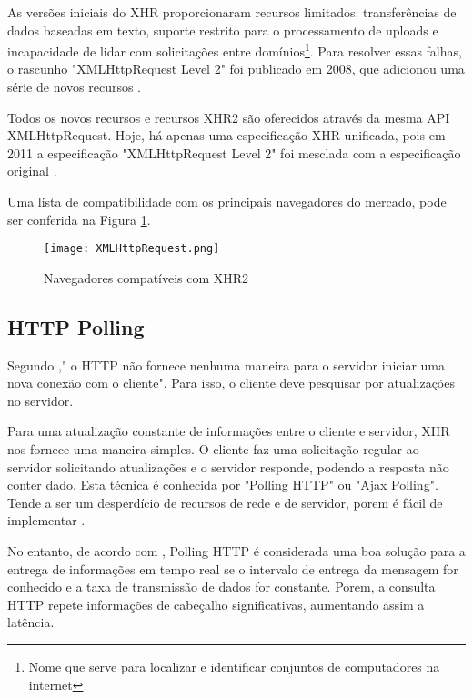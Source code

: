 \begin{citacao}
	As versões iniciais do XHR proporcionaram recursos limitados: transferências de dados baseadas em texto, suporte restrito para o processamento de uploads e incapacidade de lidar com solicitações entre domínios\footnote{Nome que serve para localizar e identificar conjuntos de computadores na internet}. Para resolver essas falhas, o rascunho "XMLHttpRequest Level 2" foi publicado em 2008, que adicionou uma série de novos recursos \cite[P.~262-263]{grigorik2013high}.
\end{citacao}

Todos os novos recursos e recursos XHR2 são oferecidos através da mesma API XMLHttpRequest. Hoje, há apenas uma especificação XHR unificada, pois em 2011 a especificação "XMLHttpRequest Level 2" foi mesclada com a especificação original \cite{grigorik2013high}.

Uma lista de compatibilidade com os principais navegadores do mercado, pode ser conferida na Figura \ref{fig:xhr2}.

\begin{figure}[!htb]
	\centering
	\texttt{[image: XMLHttpRequest.png]}
	\caption{Navegadores compatíveis com XHR2}
	\label{fig:xhr2}
\end{figure}

\subsection{HTTP Polling}

Segundo ," o HTTP não fornece nenhuma maneira para o servidor iniciar uma nova conexão com o cliente". Para isso, o cliente deve pesquisar por atualizações no servidor.

Para uma atualização constante de informações entre o cliente e servidor, XHR nos fornece uma maneira simples. O cliente faz uma solicitação regular ao servidor solicitando atualizações e o servidor responde, podendo a resposta não conter dado. Esta técnica é conhecida por "Polling HTTP" ou "Ajax Polling". Tende a ser um desperdício de recursos de rede e de servidor, porem é fácil de implementar \cite{mccarthy2009comet}.

No entanto, de acordo com , Polling HTTP é considerada uma boa solução para a entrega de informações em tempo real se o intervalo de entrega da mensagem for conhecido e  a taxa de transmissão de dados for constante. Porem, a consulta HTTP repete informações de cabeçalho significativas, aumentando assim a latência.

